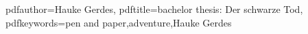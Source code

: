 \newcommand{\adventurename}{Der schwarze Tod}

\newcommand{\mainauthor}{Hauke Gerdes}
\newcommand{\coauthor}{Paul Filip}

\newcommand{\place}{mittelalterliches Hamburg}
\newcommand{\storytime}{1350 n. Chr.}
\newcommand{\playercount}{3 - 5}
\newcommand{\difficulty}{einfach}
\newcommand{\duration}{3-4 Stunden}

\hypersetup
{
	pdfauthor={\mainauthor},
	pdftitle={bachelor thesis: \adventurename},
	pdfkeywords={pen and paper,adventure,\mainauthor}
}
